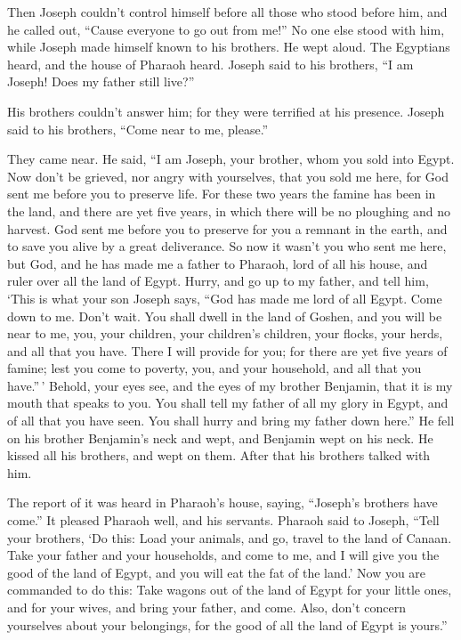  Then Joseph couldn't control himself before all those who
stood before him, and he called out, ``Cause everyone to go out from
me!'' No one else stood with him, while Joseph made himself known to his
brothers.  He wept aloud. The Egyptians heard, and the
house of Pharaoh heard.  Joseph said to his brothers, ``I
am Joseph! Does my father still live?''

His brothers couldn't answer him; for they were terrified at his
presence.  Joseph said to his brothers, ``Come near to me,
please.''

They came near. He said, ``I am Joseph, your brother, whom you sold into
Egypt.  Now don't be grieved, nor angry with yourselves,
that you sold me here, for God sent me before you to preserve life.
 For these two years the famine has been in the land, and
there are yet five years, in which there will be no ploughing and no
harvest.  God sent me before you to preserve for you a
remnant in the earth, and to save you alive by a great deliverance.
 So now it wasn't you who sent me here, but God, and he
has made me a father to Pharaoh, lord of all his house, and ruler over
all the land of Egypt.  Hurry, and go up to my father, and
tell him, `This is what your son Joseph says, ``God has made me lord of
all Egypt. Come down to me. Don't wait.  You shall dwell
in the land of Goshen, and you will be near to me, you, your children,
your children's children, your flocks, your herds, and all that you
have.  There I will provide for you; for there are yet
five years of famine; lest you come to poverty, you, and your household,
and all that you have.''\,'  Behold, your eyes see, and
the eyes of my brother Benjamin, that it is my mouth that speaks to you.
 You shall tell my father of all my glory in Egypt, and
of all that you have seen. You shall hurry and bring my father down
here.''  He fell on his brother Benjamin's neck and wept,
and Benjamin wept on his neck.  He kissed all his
brothers, and wept on them. After that his brothers talked with him.

 The report of it was heard in Pharaoh's house, saying,
``Joseph's brothers have come.'' It pleased Pharaoh well, and his
servants.  Pharaoh said to Joseph, ``Tell your brothers,
`Do this: Load your animals, and go, travel to the land of Canaan.
 Take your father and your households, and come to me,
and I will give you the good of the land of Egypt, and you will eat the
fat of the land.'  Now you are commanded to do this: Take
wagons out of the land of Egypt for your little ones, and for your
wives, and bring your father, and come.  Also, don't
concern yourselves about your belongings, for the good of all the land
of Egypt is yours.''

